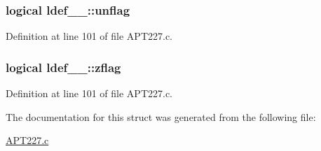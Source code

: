 \subsubsection[{\texorpdfstring{unflag}{unflag}}]{\setlength{\rightskip}{0pt plus 5cm}logical ldef\+\_\+\_\+\+::unflag}\hypertarget{structldef__1___a92e44f1effd7373161ffd2f2b3644e45}{}\label{structldef__1___a92e44f1effd7373161ffd2f2b3644e45}


Definition at line 101 of file A\+P\+T227.\+c.

\subsubsection[{\texorpdfstring{zflag}{zflag}}]{\setlength{\rightskip}{0pt plus 5cm}logical ldef\+\_\+\_\+\+::zflag}\hypertarget{structldef__1___a6ff73db9e6d009df5ebecfea161e4d26}{}\label{structldef__1___a6ff73db9e6d009df5ebecfea161e4d26}


Definition at line 101 of file A\+P\+T227.\+c.



The documentation for this struct was generated from the following file\+:\begin{DoxyCompactItemize}
\item 
\hyperlink{APT227_8c}{A\+P\+T227.\+c}\end{DoxyCompactItemize}
